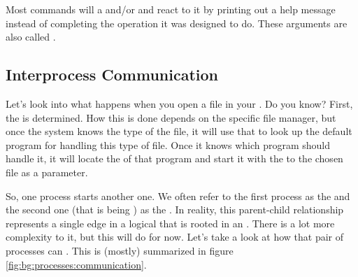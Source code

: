 Most commands will  a  and/or   and react to it by printing out a help message instead of completing the operation it was designed to do. These arguments are also called .

\subsection{Interprocess Communication}


Let's look into what happens when you open a file in your . Do you know? First, the  is determined. How this is done depends on the specific file manager, but once the system knows the type of the file, it will use that to look up the default program for handling this type of file. Once it knows which program should handle it, it will locate the  of that program and start it with the  to the chosen file as a parameter.

So, one process starts another one. We often refer to the first process as the  and the second one (that is being ) as the . In reality, this parent-child relationship represents a single edge in a logical  that is rooted in an . There is a lot more complexity to it, but this will do for now. Let's take a look at how that pair of processes can . This is (mostly) summarized in figure \ref{fig:bg:processes:communication}.

